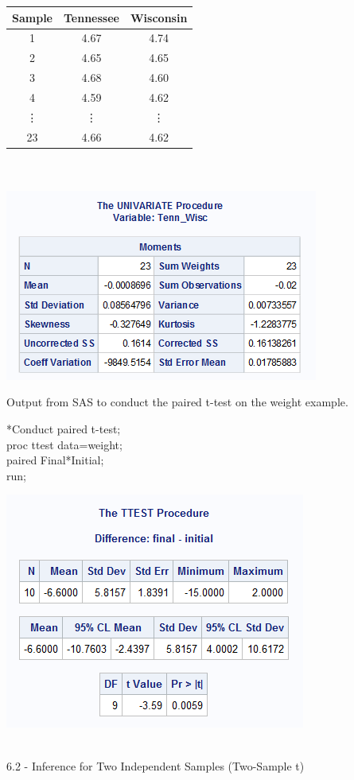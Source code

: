 \begin{multicols}{2}
\begin{tabular}{c|cc}
Sample & Tennessee & Wisconsin\\\hline
1 & 4.67 & 4.74\\
2 & 4.65 & 4.65\\
3 & 4.68 & 4.60\\
4 & 4.59 & 4.62\\
\vdots & \vdots & \vdots\\
23& 4.66 & 4.62
\end{tabular}
\columnbreak
~\\~\\
\includegraphics[scale=0.75]{catfooddiff}
\end{multicols}

\newpage

Output from SAS to conduct the paired t-test on the weight example.
\begin{multicols}{2}
*Conduct paired t-test;\\
proc ttest data=weight;\\
paired Final*Initial;\\
run; 
\columnbreak
\begin{center}
\includegraphics[scale=0.7]{weightoutput}
\end{center}
\end{multicols}
~\\
\Large 6.2 - Inference for Two Independent Samples (Two-Sample t)\normalsize\\~\\

